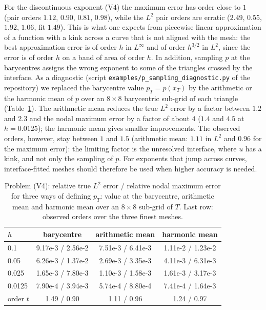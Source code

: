\documentclass[11pt]{amsart}
\theoremstyle{definition}
\theoremstyle{remark}
\numberwithin{equation}{section}
\begin{document}
For the discontinuous exponent (V4) the maximum error has order close to $1$ (pair orders $1.12$, $0.90$, $0.81$, $0.98$), while the $L^2$ pair orders are erratic ($2.49$, $0.55$, $1.92$, $1.06$, fit $1.49$). This is what one expects from piecewise linear approximation of a function with a kink across a curve that is not aligned with the mesh: the best approximation error is of order $h$ in $L^\infty$ and of order $h^{3/2}$ in $L^2$, since the error is of order $h$ on a band of area of order $h$. In addition, sampling $p$ at the barycentres assigns the wrong exponent to some of the triangles crossed by the interface. As a diagnostic (script \texttt{examples/p\_sampling\_diagnostic.py} of the repository) we replaced the barycentre value $p_T=p(x_T)$ by the arithmetic or the harmonic mean of $p$ over an $8\times8$ barycentric sub-grid of each triangle (Table~\ref{tab.avg}). The arithmetic mean reduces the true $L^2$ error by a factor between $1.2$ and $2.3$ and the nodal maximum error by a factor of about $4$ ($1.4$ and $4.5$ at $h=0.0125$); the harmonic mean gives smaller improvements. The observed orders, however, stay between $1$ and $1.5$ (arithmetic mean: $1.11$ in $L^2$ and $0.96$ for the maximum error): the limiting factor is the unresolved interface, where $u$ has a kink, and not only the sampling of $p$. For exponents that jump across curves, interface-fitted meshes should therefore be used when higher accuracy is needed.

\begin{table}[ht]
\centering
\caption{Problem (V4): relative true $L^2$ error / relative nodal maximum error for three ways of defining $p_T$: value at the barycentre, arithmetic mean and harmonic mean over an $8\times8$ sub-grid of $T$. Last row: observed orders over the three finest meshes.}\label{tab.avg}
\small
\begin{tabular}{lccc}
\toprule
$h$ & barycentre & arithmetic mean & harmonic mean\\
\midrule
0.1    & 9.17e-3 / 2.56e-2 & 7.51e-3 / 6.41e-3 & 1.11e-2 / 1.23e-2\\
0.05   & 6.26e-3 / 1.37e-2 & 2.69e-3 / 3.35e-3 & 4.11e-3 / 6.31e-3\\
0.025  & 1.65e-3 / 7.80e-3 & 1.10e-3 / 1.58e-3 & 1.61e-3 / 3.17e-3\\
0.0125 & 7.90e-4 / 3.94e-3 & 5.74e-4 / 8.80e-4 & 7.41e-4 / 1.64e-3\\
\midrule
order $t$ & 1.49 / 0.90 & 1.11 / 0.96 & 1.24 / 0.97\\
\bottomrule
\end{tabular}
\end{table}
\end{document}
